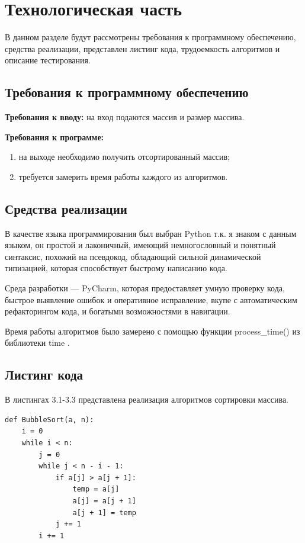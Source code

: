 \documentclass[12pt]{report}
\begin{document}
\chapter{Технологическая часть}
В данном разделе будут рассмотрены требования к программному обеспечению, средства реализации, представлен листинг кода, трудоемкость алгоритмов и описание тестирования.
\section{Требования к программному обеспечению}
\textbf{Требования к вводу:} на вход подаются массив и размер массива.\vspace{\baselineskip} 

\textbf{Требования к программе:}
\begin{enumerate}
	\item на выходе
	необходимо получить отсортированный массив;
	\item требуется замерить время работы
	каждого из алгоритмов. 
\end{enumerate}
\section{Средства реализации}
В качестве языка программирования был выбран Python т.к. я знаком с данным языком, он простой и лаконичный, имеющий немногословный и понятный синтаксис, похожий на псевдокод, обладающий сильной динамической типизацией, которая способствует быстрому написанию кода. 

Среда разработки — PyCharm, которая предоставляет умную проверку кода, быстрое выявление ошибок и оперативное исправление, вкупе с автоматическим рефакторингом кода, и богатыми возможностями в навигации.  

Время  работы алгоритмов было замерено с помощью функции process\_time() из библиотеки time \cite{time}.

\newpage
\section{Листинг кода}

В листингах 3.1-3.3 представлена реализация алгоритмов сортировки массива.
\vspace{\baselineskip}

\begin{lstlisting}[label=some-code,caption=Сортировка массива «пузырьком»]
def BubbleSort(a, n):
	i = 0
	while i < n:
		j = 0
		while j < n - i - 1:
			if a[j] > a[j + 1]:
				temp = a[j]
				a[j] = a[j + 1]
				a[j + 1] = temp
			j += 1
		i += 1
\end{lstlisting}
\end{document}
